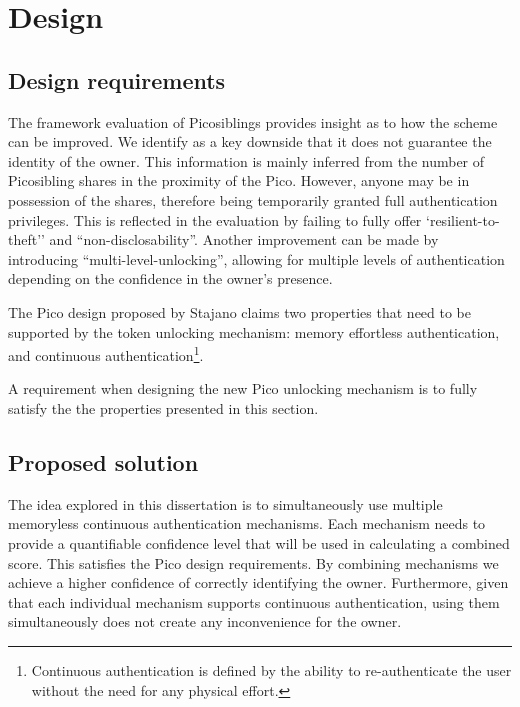 
\chapter{Design} %

\label{Chapter4} %


\section{Design requirements}
The framework evaluation of Picosiblings provides insight as to how the scheme can be improved. We identify as a key downside that it does not guarantee the identity of the owner. This information is mainly inferred from the number of Picosibling shares in the proximity of the Pico. However, anyone may be in possession of the shares, therefore being temporarily granted full authentication privileges. This is reflected in the evaluation by failing to fully offer `resilient-to-theft'' and ``non-disclosability''. Another improvement can be made by introducing ``multi-level-unlocking'', allowing for multiple levels of authentication depending on the confidence in the owner's presence.

The Pico design proposed by Stajano \cite{stajano2011pico} claims two properties that need to be supported by the token unlocking mechanism: memory effortless authentication, and continuous authentication\footnote{Continuous authentication is defined by the ability to re-authenticate the user without the need for any physical effort.}. 

A requirement when designing the new Pico unlocking mechanism is to fully satisfy the the properties presented in this section.

\section{Proposed solution}
\label{propopsedsol}
The idea explored in this dissertation is to simultaneously use multiple memoryless continuous authentication mechanisms. Each mechanism needs to provide a quantifiable confidence level that will be used in calculating a combined score. This satisfies the Pico design requirements. By combining mechanisms we achieve a higher confidence of correctly identifying the owner. Furthermore, given that each individual mechanism supports continuous authentication, using them simultaneously does not create any inconvenience for the owner.

